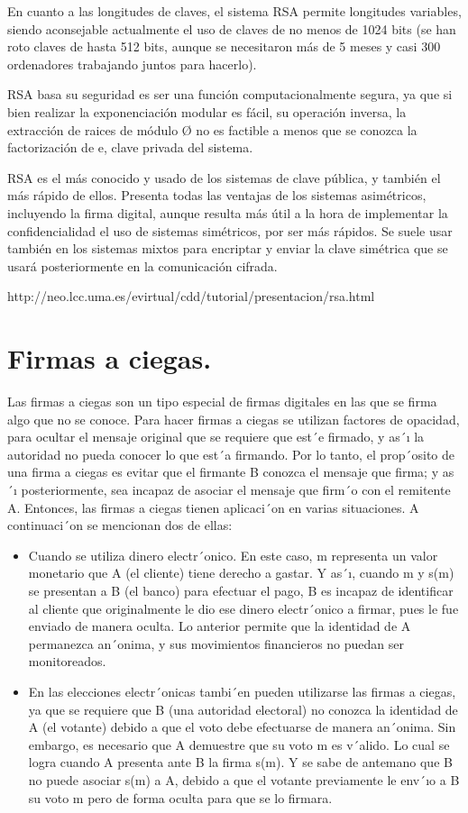 En cuanto a las longitudes de claves, el sistema RSA permite longitudes variables, siendo aconsejable actualmente el uso de claves de no menos de 1024 bits (se han roto claves de hasta 512 bits, aunque se necesitaron más de 5 meses y casi 300 ordenadores trabajando juntos para hacerlo).

RSA basa su seguridad es ser una función computacionalmente segura, ya que si bien realizar la exponenciación modular es fácil, su operación inversa, la extracción de raices de módulo Ø no es factible a menos que se conozca la factorización de e, clave privada del sistema.

RSA es el más conocido y usado de los sistemas de clave pública, y también el más rápido de ellos. Presenta todas las ventajas de los sistemas asimétricos, incluyendo la firma digital, aunque resulta más útil a la hora de implementar la confidencialidad el uso de sistemas simétricos, por ser más rápidos. Se suele usar también en los sistemas mixtos para encriptar y enviar la clave simétrica que se usará posteriormente en la comunicación cifrada.

http://neo.lcc.uma.es/evirtual/cdd/tutorial/presentacion/rsa.html

\section{Firmas a ciegas. }

Las firmas a ciegas son un tipo especial de firmas digitales en las que se firma algo que no se conoce. Para hacer firmas a ciegas se utilizan factores de opacidad, para ocultar el mensaje original que se requiere que est´e firmado, y as´ı la autoridad no pueda conocer lo que est´a firmando.
Por lo tanto, el prop´osito de una firma a ciegas es evitar que el firmante B conozca el mensaje que firma; y as´ı posteriormente, sea incapaz de asociar el mensaje que firm´o con el remitente A. Entonces, las firmas a ciegas tienen aplicaci´on en varias situaciones. A continuaci´on se mencionan dos de ellas:
\begin{itemize}
	\item Cuando se utiliza dinero electr´onico. En este caso, m representa un valor monetario que A (el cliente) tiene derecho a gastar. Y as´ı, cuando m y s(m) se presentan a B (el banco) para efectuar el pago, B es incapaz de identificar al cliente que originalmente le dio ese dinero electr´onico a firmar, pues le fue enviado de manera oculta. Lo anterior permite que la identidad de A 	permanezca an´onima, y sus movimientos financieros no puedan ser monitoreados.
	\item En las elecciones electr´onicas tambi´en pueden utilizarse las firmas a ciegas, ya que se requiere que B (una autoridad electoral) no conozca la identidad de A (el votante) debido a que el voto debe efectuarse de manera an´onima. Sin embargo, es necesario que A demuestre que su voto m es v´alido. Lo cual se logra cuando A presenta ante B la firma s(m). Y se sabe de antemano que B no puede asociar s(m) a A, debido a que el votante previamente le env´ıo a B su voto m pero de forma oculta para que se lo firmara.
\end{itemize} 


